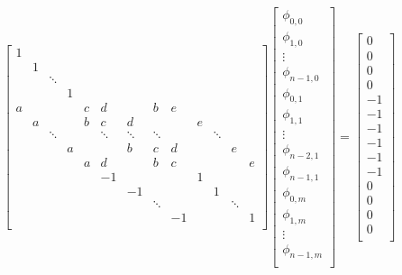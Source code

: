 \begin{equation}
\begin{bmatrix}
      1 &   & 											\\[0.8pt]
        & 1 & 											\\[0.8pt]
        &   & \ddots 									\\[0.8pt]       
        &   &   & 1 									\\[0.8pt]           
      a &   &   &   & c & d &   & b & e 				\\[0.8pt]
        & a &   &   & b & c & d &   &   & e	    		\\[0.8pt]
        &&\ddots&&&\ddots&\ddots&\ddots&&&\ddots	   	\\[0.8pt]
        &   &   & a &   &   & b & c & d &   &   & e 	\\[0.8pt]
        &   &   &   & a & d &   & b & c &   &   &   & e \\[0.8pt]
        &   &   &   &   & -1&   &   &   & 1 &   &   &   \\[0.8pt]
        &   &   &   &   &   & -1&   &   &   & 1 &   &   \\[0.8pt]
        &   &   &   &   &   &  &\ddots &&   &&\ddots&   \\[0.8pt]
        &   &   &   &   &   &   &   & -1&   &   &   & 1 \\[0.8pt]
\end{bmatrix}
\begin{bmatrix}
	\phi_{0,0} 		\\[0.8pt]
	\phi_{1,0} 		\\[0.8pt]
		\vdots 		\\[0.8pt]
	\phi_{n-1,0} 	\\[0.8pt]
	\phi_{0,1} 		\\[0.8pt]
	\phi_{1,1} 		\\[0.8pt]
		\vdots 		\\[0.8pt]
	\phi_{n-2,1} 	\\[0.8pt]
	\phi_{n-1,1} 	\\[0.8pt]
	\phi_{0,m} 		\\[0.8pt]
	\phi_{1,m} 		\\[0.8pt]
		\vdots 		\\[0.8pt]
	\phi_{n-1,m}	\\[0.8pt]	
\end{bmatrix}
=
\begin{bmatrix}
	0 \\[0.8pt]
	0 \\[0.8pt]
	0 \\[0.8pt]
	0 \\[0.8pt]
   -1 \\[0.8pt]
   -1 \\[0.8pt]
   -1 \\[0.8pt]
   -1 \\[0.8pt]
   -1 \\[0.8pt]
   -1 \\[0.8pt]
	0 \\[0.8pt]
	0 \\[0.8pt]
	0 \\[0.8pt]
	0 \\[0.8pt]
\end{bmatrix}
\label{eq:poisson_macierz}
\end{equation}

